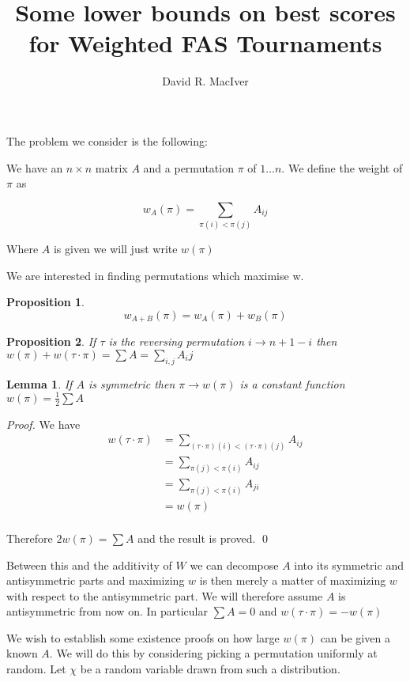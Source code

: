 \documentclass[a4paper,10pt]{article}
\title{Some lower bounds on best scores for Weighted FAS Tournaments}
\author{David R. MacIver}
\newtheorem{prop}{Proposition}
\newtheorem{lemma}[theorem]{Lemma}
\begin{document}
\maketitle

The problem we consider is the following:

We have an $n \times n$ matrix $A$ and a permutation $\pi$ of $1 \ldots n$. We define the weight of $\pi$ as

\[ w_A(\pi) = \sum_{\pi(i) < \pi(j)} A_{i j} \]

Where $A$ is given we will just write $w(\pi)$

We are interested in finding permutations which maximise w.

\begin{prop}
  \[ w_{A + B}(\pi) = w_A(\pi) + w_B(\pi) \]
\end{prop}

\begin{prop}
  If $\tau$ is the reversing permutation $i \to n + 1 - i$ then $w(\pi) + w(\tau \cdot \pi) = \sum A = \sum_{i, j} A_ij$
\end{prop}

\begin{lemma}
If $A$ is symmetric then $\pi \to w(\pi)$ is a constant function $w(\pi) = \frac{1}{2} \sum A$
\end{lemma}

\begin{proof}
We have 
\begin{align*}
w(\tau \cdot \pi) &= \sum_{(\tau \cdot \pi)(i) < (\tau \cdot \pi)(j)} A_{ij} \\
& = \sum_{\pi(j) < \pi(i)} A_{ij} \\
& = \sum_{\pi(j) < \pi(i)} A_{ji} \\
& = w(\pi) \\
\end{align*}

Therefore $2 w(\pi) = \sum A$ and the result is proved.
\qed
\end{proof}

Between this and the additivity of $W$ we can decompose $A$ into its symmetric and antisymmetric parts and maximizing $w$ is then merely a matter of maximizing $w$ with respect to the antisymmetric part. We will therefore assume $A$ is antisymmetric from now on. In particular $\sum A = 0$ and $w(\tau \cdot \pi) = - w(\pi)$

We wish to establish some existence proofs on how large $w(\pi)$ can be given a known $A$. We will do this by considering picking a permutation uniformly at random. Let $\chi$ be a random variable drawn from such a distribution.
\end{document}
